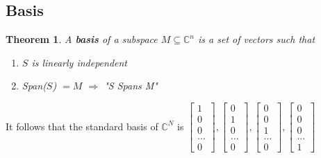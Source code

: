 \documentclass[12pt]{article}
\theoremstyle{plain}
\newtheorem{theorem}[lemma]{Theorem}
\theoremstyle{nonumberplain}
\theoremstyle{plain}
\theoremstyle{nonumberplain}
\newcommand\1{{\bf 1}}
\newcommand{\bmat}[1]{\begin{bmatrix*} #1 \end{bmatrix*}} %
\newcommand{\C}{\mathbb{C}} %
\newcommand{\<}{\left\langle}
\renewcommand{\>}{\right\rangle}
\begin{document}
\subsection{Basis}
\begin{theorem}
A \textbf{basis} of a subspace $M\subseteq\C^n$ is a set of vectors such that
\begin{enumerate}
	\item $S$ is linearly independent
	\item Span($S$) $=M$ $\Longrightarrow$ "S Spans M"
\end{enumerate}
\end{theorem}
It follows that the standard basis of $\C^N$ is $\bmat{1 \\ 0 \\ 0 \\ ... \\ 0},\bmat{0 \\ 1 \\ 0 \\ ... \\ 0},\bmat{0 \\ 0 \\ 1 \\ ... \\ 0},\bmat{0 \\ 0 \\ 0 \\ ... \\ 1}$

\end{document}
